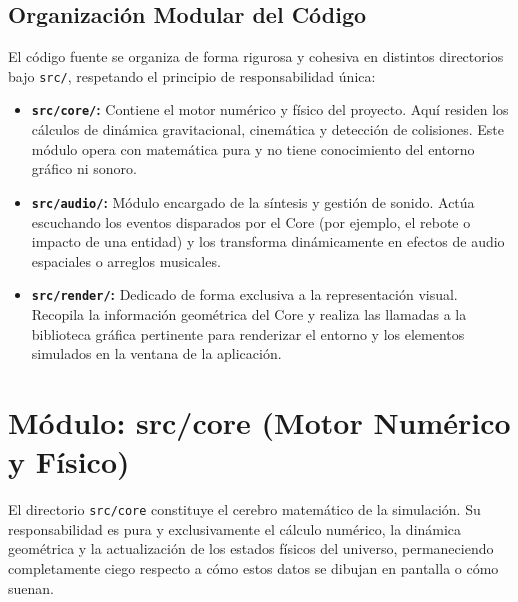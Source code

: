 \documentclass[12pt, openany]{book}
\begin{document}
\subsection{Organización Modular del Código}
El código fuente se organiza de forma rigurosa y cohesiva en distintos directorios bajo \texttt{src/}, respetando el principio de responsabilidad única:

\begin{itemize}
    \item \textbf{\texttt{src/core/}:} Contiene el motor numérico y físico del proyecto. Aquí residen los cálculos de dinámica gravitacional, cinemática y detección de colisiones. Este módulo opera con matemática pura y no tiene conocimiento del entorno gráfico ni sonoro.
    \item \textbf{\texttt{src/audio/}:} Módulo encargado de la síntesis y gestión de sonido. Actúa escuchando los eventos disparados por el Core (por ejemplo, el rebote o impacto de una entidad) y los transforma dinámicamente en efectos de audio espaciales o arreglos musicales.
    \item \textbf{\texttt{src/render/}:} Dedicado de forma exclusiva a la representación visual. Recopila la información geométrica del Core y realiza las llamadas a la biblioteca gráfica pertinente para renderizar el entorno y los elementos simulados en la ventana de la aplicación.
\end{itemize}

\section{Módulo: src/core (Motor Numérico y Físico)}

El directorio \texttt{src/core} constituye el cerebro matemático de la simulación. Su responsabilidad es pura y exclusivamente el cálculo numérico, la dinámica geométrica y la actualización de los estados físicos del universo, permaneciendo completamente ciego respecto a cómo estos datos se dibujan en pantalla o cómo suenan.
\end{document}

